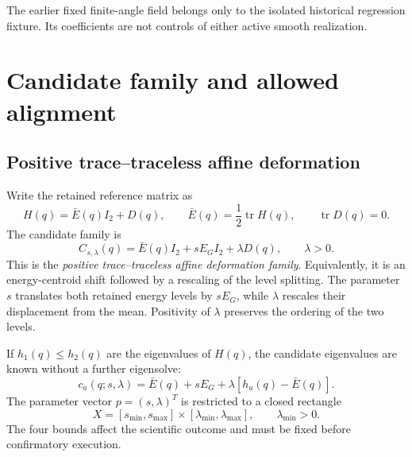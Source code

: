 \documentclass[11pt]{article}
\begin{document}
The earlier fixed finite-angle field belongs only to the isolated historical regression
fixture. Its coefficients are not controls of either active smooth realization.

\section{Candidate family and allowed alignment}

\subsection{Positive trace--traceless affine deformation}

Write the retained reference matrix as
\begin{equation}
 H(q)=\bar E(q)I_2+D(q),
 \qquad
 \bar E(q)=\frac12\operatorname{tr}H(q),
 \qquad
 \operatorname{tr}D(q)=0.
 \label{eq:trace-decomposition}
\end{equation}
The candidate family is
\begin{equation}
 C_{s,\lambda}(q)
 =\bar E(q)I_2+sE_GI_2+\lambda D(q),
 \qquad \lambda>0.
 \label{eq:candidate}
\end{equation}
This is the \emph{positive trace--traceless affine deformation family}. Equivalently,
it is an energy-centroid shift followed by a rescaling of the level splitting. The
parameter $s$ translates both retained energy levels by $sE_G$, while $\lambda$ rescales
their displacement from the mean. Positivity of $\lambda$ preserves the ordering of the
two levels.

If $h_1(q)\le h_2(q)$ are the eigenvalues of $H(q)$, the candidate eigenvalues are known
without a further eigensolve:
\begin{equation}
 c_a(q;s,\lambda)
 =\bar E(q)+sE_G+\lambda[h_a(q)-\bar E(q)].
 \label{eq:candidate-eigenvalues}
\end{equation}
The parameter vector $p=(s,\lambda)^T$ is restricted to a closed rectangle
\begin{equation}
 X=[s_{\min},s_{\max}]
 \times[\lambda_{\min},\lambda_{\max}],
 \qquad \lambda_{\min}>0.
 \label{eq:parameter-box}
\end{equation}
The four bounds affect the scientific outcome and must be fixed before confirmatory
execution.
\end{document}
